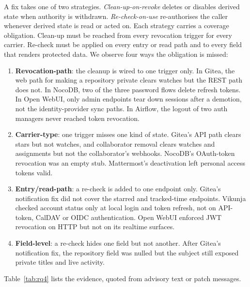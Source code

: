 \documentclass[preprint,12pt]{elsarticle}
\begin{document}
A fix takes one of two strategies. \emph{Clean-up-on-revoke} deletes or disables derived state when
authority is withdrawn. \emph{Re-check-on-use} re-authorises the caller whenever derived state is read or
acted on. Each strategy carries a coverage obligation. Clean-up must be reached from every revocation trigger for
every carrier. Re-check must be applied on every entry or read path and to every field that renders protected
data. We observe four ways the obligation is missed:
\begin{enumerate}
\item \textbf{Revocation-path}: the cleanup is wired to one trigger only. In Gitea, the web path for making a repository
private clears watches but the REST path does not. In NocoDB, two of the three password flows delete refresh
tokens. In Open WebUI, only admin endpoints tear down sessions after a demotion, not the identity-provider sync
paths. In Airflow, the logout of two auth managers never reached token revocation.
\item \textbf{Carrier-type}: one trigger misses one kind of state. Gitea's API path clears stars but not watches,
and collaborator removal clears watches and assignments but not the collaborator's webhooks. NocoDB's OAuth-token
revocation was an empty stub. Mattermost's deactivation left personal access tokens valid.
\item \textbf{Entry/read-path}: a re-check is added to one endpoint only. Gitea's notification fix did not
cover the starred and tracked-time endpoints. Vikunja checked account status only at local login and token
refresh, not on API-token, CalDAV or OIDC authentication. Open WebUI enforced JWT revocation on HTTP but not on
its realtime surfaces.
\item \textbf{Field-level}: a re-check hides one field but not another. After Gitea's notification fix,
the repository field was nulled but the subject still exposed private titles and live activity.
\end{enumerate}
Table~\ref{tab:rq4} lists the evidence, quoted from advisory text or patch messages.
\end{document}
